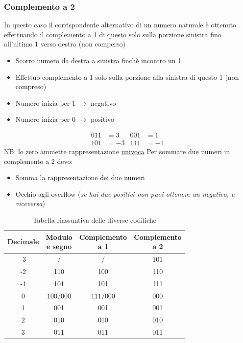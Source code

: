\subsubsection*{Complemento a 2}
In questo caso il corrispondente alternativo di un numero naturale è ottenuto effettuando il complemento a 1 di questo solo sulla porzione sinistra fino all'ultimo 1 verso destra (non comperso)
\begin{itemize}
	\item Scorro numero da destra a sinistra finchè incontro un 1
	\item Effettuo complemento a 1 solo sulla porzione alla sinistra di questo 1 (non compreso)
\end{itemize}
\begin{itemize}
	\item Numero inizia per 1 $ \rightarrow  $ negativo
	\item Numero inizia per 0 $ \rightarrow  $ positivo
\end{itemize}
\begin{align*}
	011 & =3   & 001 & = 1  \\
	101 & = -3 & 111 & = -1
\end{align*}
NB: lo zero ammette rappresentazione \underline{univoca}
\vskip3mm
Per sommare due numeri in complemento a 2 devo:
\begin{itemize}
	\item Somma la rappresentazione dei due numeri
	\item Occhio agli overflow (\textit{se hai due positivi non puoi ottenere un negativo, e viceversa})
\end{itemize}
\begin{table}[H]
	\begin{center}
		\begin{tabular}{|c|c|c|c|}
			\hline
			Decimale & \makecell{Modulo                     \\e segno} &\makecell{Complemento \\a 1} & \makecell{Complemento \\a 2}  \\
			\hline
			-3       & /                & /           & 101 \\
			-2       & 110              & 100         & 110 \\
			-1       & 101              & 101         & 111 \\
			0        & $100 / 000 $     & $111 / 000$ & 000 \\
			1        & 001              & 001         & 001 \\
			2        & 010              & 010         & 010 \\
			3        & 011              & 011         & 011 \\
			\hline
		\end{tabular}
	\end{center}
	\caption{Tabella riassuntiva delle diverse codifiche}
\end{table}
